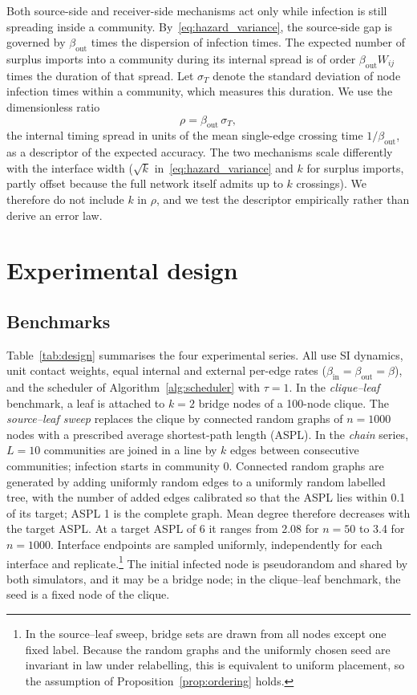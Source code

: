 \documentclass[a4paper,fleqn]{cas-sc}
\begin{document}
Both source-side and receiver-side mechanisms act only while infection is still spreading inside a community. By~\eqref{eq:hazard_variance}, the source-side gap is governed by $\beta_{\mathrm{out}}$ times the dispersion of infection times. The expected number of surplus imports into a community during its internal spread is of order $\beta_{\mathrm{out}}W_{ij}$ times the duration of that spread. Let $\sigma_T$ denote the standard deviation of node infection times within a community, which measures this duration. We use the dimensionless ratio
\begin{equation}
\label{eq:rho}
\rho=\beta_{\mathrm{out}}\,\sigma_T,
\end{equation}
the internal timing spread in units of the mean single-edge crossing time $1/\beta_{\mathrm{out}}$, as a descriptor of the expected accuracy. The two mechanisms scale differently with the interface width ($\sqrt{k}$ in~\eqref{eq:hazard_variance} and $k$ for surplus imports, partly offset because the full network itself admits up to $k$ crossings). We therefore do not include $k$ in $\rho$, and we test the descriptor empirically rather than derive an error law.

\section{Experimental design}
\label{sec:design}

\subsection{Benchmarks}

Table~\ref{tab:design} summarises the four experimental series. All use SI dynamics, unit contact weights, equal internal and external per-edge rates ($\beta_{\mathrm{in}}=\beta_{\mathrm{out}}=\beta$), and the scheduler of Algorithm~\ref{alg:scheduler} with $\tau=1$. In the \emph{clique--leaf} benchmark, a leaf is attached to $k=2$ bridge nodes of a 100-node clique. The \emph{source--leaf sweep} replaces the clique by connected random graphs of $n=1000$ nodes with a prescribed average shortest-path length (ASPL). In the \emph{chain} series, $L=10$ communities are joined in a line by $k$ edges between consecutive communities; infection starts in community 0. Connected random graphs are generated by adding uniformly random edges to a uniformly random labelled tree, with the number of added edges calibrated so that the ASPL lies within 0.1 of its target; ASPL 1 is the complete graph. Mean degree therefore decreases with the target ASPL. At a target ASPL of 6 it ranges from 2.08 for $n=50$ to 3.4 for $n=1000$. Interface endpoints are sampled uniformly, independently for each interface and replicate.\footnote{In the source--leaf sweep, bridge sets are drawn from all nodes except one fixed label. Because the random graphs and the uniformly chosen seed are invariant in law under relabelling, this is equivalent to uniform placement, so the assumption of Proposition~\ref{prop:ordering} holds.} The initial infected node is pseudorandom and shared by both simulators, and it may be a bridge node; in the clique--leaf benchmark, the seed is a fixed node of the clique.
\end{document}
